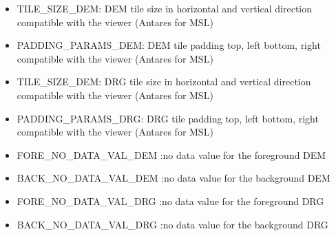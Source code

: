 \begin{itemize}
        \item{\textsc{TILE\_SIZE\_DEM}}: DEM tile size in horizontal and vertical direction compatible with the viewer (Antares for MSL)
        \item{\textsc{PADDING\_PARAMS\_DEM}}: DEM tile padding top, left bottom, right compatible with the viewer (Antares for MSL)
        \item{\textsc{TILE\_SIZE\_DEM}}: DRG tile size in horizontal and vertical direction compatible with the viewer (Antares for MSL)
	\item{\textsc{PADDING\_PARAMS\_DRG}}: DRG tile padding top, left bottom, right compatible with the viewer (Antares for MSL)
        \item{\textsc{FORE\_NO\_DATA\_VAL\_DEM}} :no data value for the foreground DEM
        \item{\textsc{BACK\_NO\_DATA\_VAL\_DEM}} :no data value for the background DEM
        \item{\textsc{FORE\_NO\_DATA\_VAL\_DRG}} :no data value for the foreground DRG
        \item{\textsc{BACK\_NO\_DATA\_VAL\_DRG}} :no data value for the background DRG

\end{itemize}



